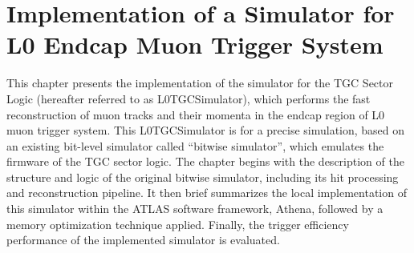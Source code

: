 \chapter{Implementation of a Simulator for L0 Endcap Muon Trigger System} \label{ch:L0MuonS1TGC}
This chapter presents the implementation of the simulator for the TGC Sector Logic (hereafter referred to as L0TGCSimulator), which performs the fast reconstruction of muon tracks and their momenta in the endcap region of L0 muon trigger system. This L0TGCSimulator is for a precise simulation, based on an existing bit-level simulator called ``bitwise simulator'', which emulates the firmware of the TGC sector logic. The chapter begins with the description of the structure and logic of the original bitwise simulator, including its hit processing and reconstruction pipeline. It then brief summarizes the local implementation of this simulator within the ATLAS software framework, Athena, followed by a memory optimization technique applied. Finally, the trigger efficiency performance of the implemented simulator is evaluated.
